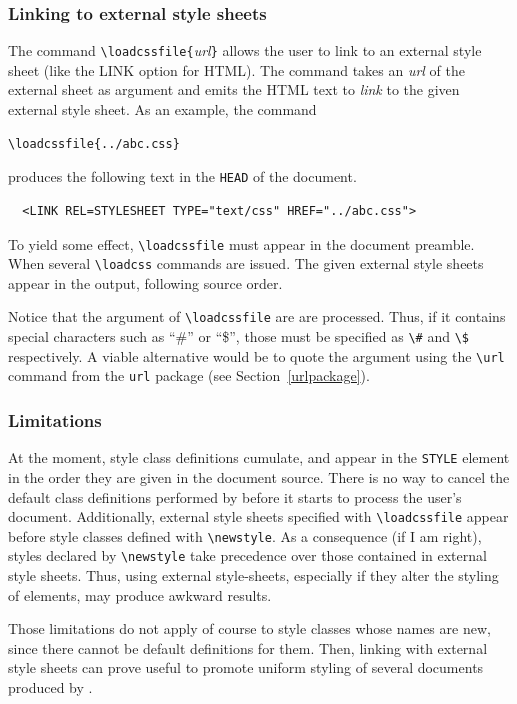 \subsubsection{Linking to external style sheets}
%
%
The \hevea{} command \verb+\loadcssfile{+\textit{url}\verb+}+ allows the
user to link to an external style sheet (like the LINK option for
HTML). The command takes an \textit{url} of the external
sheet as argument and emits the HTML text to
\emph{link} to the given external style sheet. As an example, the command
\begin{verbatim}
\loadcssfile{../abc.css}
\end{verbatim}
produces the following \html{} text in the \verb+HEAD+ of the document.
\begin{verbatim}
  <LINK REL=STYLESHEET TYPE="text/css" HREF="../abc.css">
\end{verbatim} 
To yield some effect, \verb+\loadcssfile+ must appear in the  document
preamble.
When several \verb+\loadcss+ commands are issued. The given external
style sheets appear in the output, following source order.

Notice that the argument of \verb+\loadcssfile+ are
are processed. Thus, if it
contains special characters such as ``\#'' or ``\$'', those must be specified
as \verb+\#+ and \verb+\$+ respectively.
A viable alternative would be to quote
the argument using the \verb+\url+ command from the \texttt{url}
package (see Section~\ref{urlpackage}).

\subsubsection{Limitations}
At the moment, style class definitions cumulate, and appear
in the \verb+STYLE+ element in the order they are given in the
document source. There is no way to cancel the default class
definitions performed by \hevea{} before it starts to process the
user's document.
Additionally, external style sheets specified with \verb+\loadcssfile+
appear before style classes defined with \verb+\newstyle+.
As a consequence (if I am right), styles
declared by \verb+\newstyle+ take precedence over those contained in
external style sheets. Thus, using external style-sheets, especially
if they alter the styling of elements, may produce awkward results.

Those limitations do not apply of course to style classes whose
names are new, since there cannot be default definitions for them.
Then, linking with external style sheets can prove useful to
promote uniform styling of several documents produced by \hevea{}.


